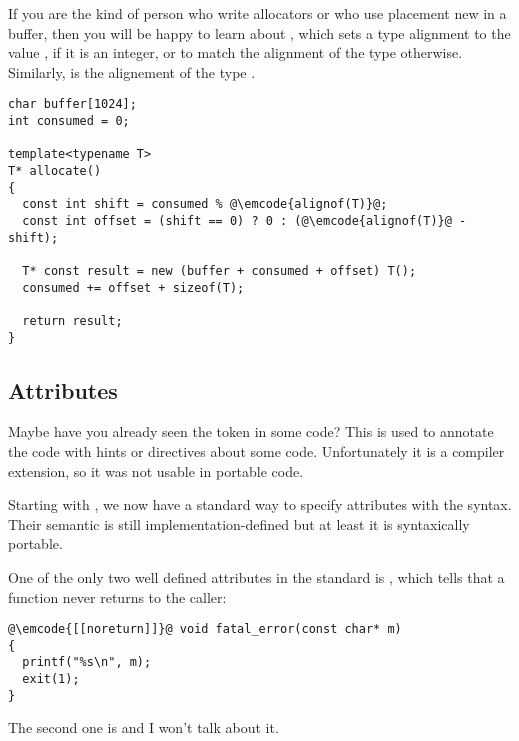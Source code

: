 If you are the kind of person who write allocators or who use
placement new in a buffer, then you will be happy to learn
about , which sets a type alignment to the
value , if it is an integer, or to match the alignment of the
type  otherwise. Similarly,  is the
alignement of the type .

\begin{lstlisting}
char buffer[1024];
int consumed = 0;

template<typename T>
T* allocate()
{
  const int shift = consumed % @\emcode{alignof(T)}@;
  const int offset = (shift == 0) ? 0 : (@\emcode{alignof(T)}@ - shift);

  T* const result = new (buffer + consumed + offset) T();
  consumed += offset + sizeof(T);

  return result;
}
\end{lstlisting}

\subsection{Attributes}

Maybe have you already seen the  token in
some \cpp{} code? This is used to annotate the code with hints or
directives about some code. Unfortunately it is a compiler extension,
so it was not usable in portable code.

Starting with , we now have a standard way to specify attributes
with the  syntax. Their semantic is still
implementation-defined but at least it is syntaxically portable.

One of the only two well defined attributes in the 
standard is \code{[[noreturn]]}, which tells that a function never
returns to the caller:

\begin{lstlisting}
@\emcode{[[noreturn]]}@ void fatal_error(const char* m)
{
  printf("%s\n", m);
  exit(1);
}
\end{lstlisting}

The second one is  and I won't talk
about it.
